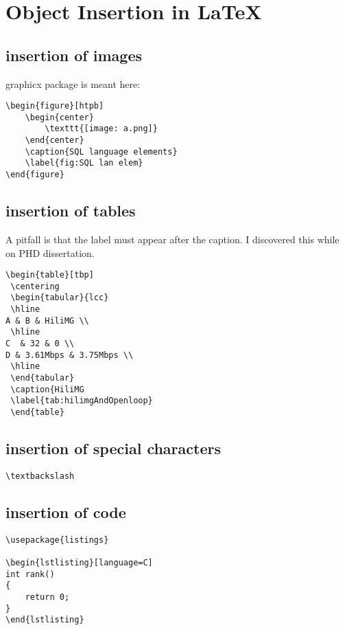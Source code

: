 
\section{Object Insertion in LaTeX}

\subsection{insertion of images}
graphicx package is meant here:
\begin{lstlisting}[language={[LaTex]Tex}]
\begin{figure}[htpb]
    \begin{center}
        \texttt{[image: a.png]}
    \end{center}
    \caption{SQL language elements}
    \label{fig:SQL lan elem}
\end{figure}
\end{lstlisting}

\subsection{insertion of tables}

A pitfall is that the label must appear after the caption. 
I discovered this while on PHD dissertation.
\begin{lstlisting}[language={[LaTex]Tex}]
\begin{table}[tbp]
 \centering 
 \begin{tabular}{lcc}  
 \hline
A & B & HiliMG \\ 
 \hline  
C  & 32 & 0 \\         
D & 3.61Mbps & 3.75Mbps \\        
 \hline
 \end{tabular}
 \caption{HiliMG
 \label{tab:hilimgAndOpenloop}
 \end{table}
\end{lstlisting}


\subsection{insertion of special characters}
\verb+\textbackslash+


\subsection{insertion of code}
\begin{verbatim}
\usepackage{listings} 

\begin{lstlisting}[language=C]
int rank()
{ 
    return 0;
}
\end{lstlisting}
\end{verbatim}


